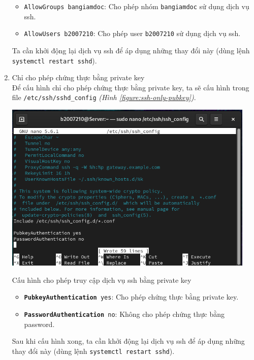 \documentclass[a4paper, 11pt]{article}
\begin{document}
\begin{enumerate}
\begin{minipage}
              \caption{Cho phép nhóm \texttt{bangiamdoc} và user \texttt{b2007210} có quyền điều khiển máy tính từ xa}
              \label{figure:allow-groups-users}
          \end{minipage}
          \begin{itemize}
              \item \texttt{AllowGroups bangiamdoc}: Cho phép nhóm \texttt{bangiamdoc} sử dụng dịch vụ ssh.
              \item \texttt{AllowUsers b2007210}: Cho phép user \texttt{b2007210} sử dụng dịch vụ ssh.
          \end{itemize}

          Ta cần khởi động lại dịch vụ ssh để áp dụng những thay đổi này (dùng lệnh \texttt{systemctl restart sshd}).
    \item Chỉ cho phép chứng thực bằng private key \hfill \\
          Để cấu hình chỉ cho phép chứng thực bằng private key, ta sẽ cấu hình trong file \texttt{/etc/ssh/sshd\_config} \textit{(Hình \ref{figure:ssh-only-pubkey})}. \\
          \begin{minipage}
              {\linewidth}
              \captionsetup{type=figure}
              \centering
              \includegraphics[width=12cm]{images/ssh-only-pubkey.png}
              \caption{Cấu hình cho phép truy cập dịch vụ ssh bằng private key}
              \label{figure:ssh-only-pubkey}
          \end{minipage}
          \begin{itemize}
              \item \texttt{\textbf{PubkeyAuthentication} yes}: Cho phép chứng thực bằng private key.
              \item \texttt{\textbf{PasswordAuthentication} no}: Không cho phép chứng thực bằng password.
          \end{itemize}
          Sau khi cấu hình xong, ta cần khởi động lại dịch vụ ssh để áp dụng những thay đổi này (dùng lệnh \texttt{systemctl restart sshd}).


\end{enumerate}
\end{document}
